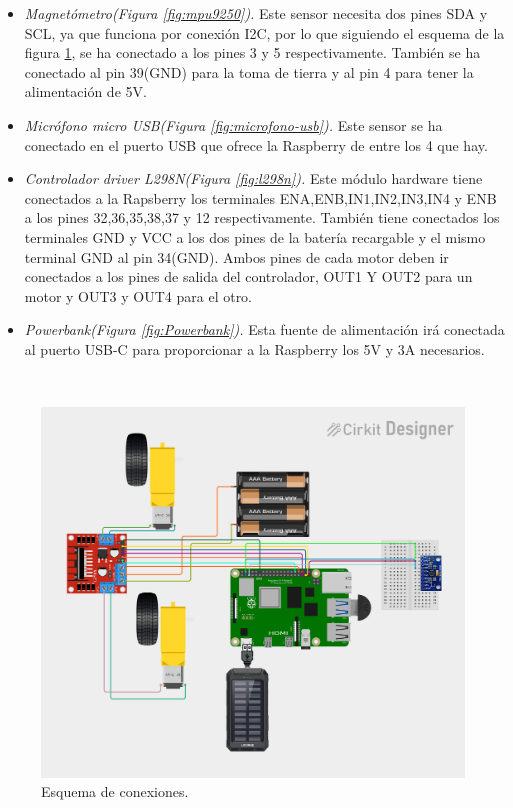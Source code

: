 \begin{itemize}
 \item \textit{Magnetómetro(Figura \ref{fig:mpu9250}).} Este sensor necesita dos pines SDA y SCL, ya que funciona por conexión I2C, por lo que siguiendo el esquema de la figura \ref{fig:circuito}, se ha conectado a los pines 3 y 5 respectivamente. También se ha conectado al pin 39(GND) para la toma de tierra y al pin 4 para tener la alimentación de  5V. 
 \item \textit{Micrófono micro USB(Figura \ref{fig:microfono-usb}).} Este sensor se ha conectado en el puerto USB que ofrece la Raspberry de entre los 4 que hay.
 \item \textit{Controlador driver L298N(Figura \ref{fig:l298n}).} Este módulo hardware tiene conectados a la Rapsberry los terminales ENA,ENB,IN1,IN2,IN3,IN4 y ENB a los pines 32,36,35,38,37 y 12 respectivamente. También tiene conectados los terminales GND y VCC a los dos pines de la batería recargable y el mismo terminal GND al pin 34(GND). Ambos pines de cada motor deben ir conectados a los pines de salida del controlador, OUT1 Y OUT2 para un motor y OUT3 y OUT4 para el otro.
 \item \textit{Powerbank(Figura \ref{fig:Powerbank}).} Esta fuente de alimentación irá conectada al puerto USB-C para proporcionar a la Raspberry los 5V y 3A necesarios.
\end{itemize}\


\begin{figure}[H]
  \centering
  \includegraphics[scale=0.5]{figs/final_circuito} %
  \caption{Esquema de conexiones.}
  \label{fig:circuito}
\end{figure}

